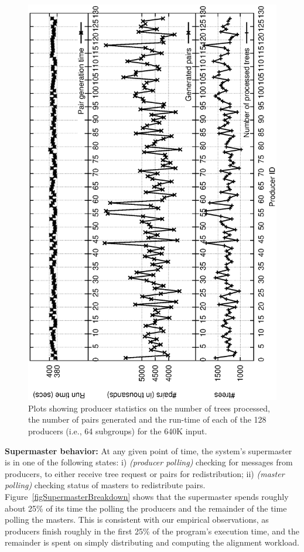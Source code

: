 \documentclass[10pt,journal,letterpaper,compsoc]{IEEEtran}
\begin{document}
\begin{figure}[tb]
\centerline{
            \includegraphics[angle=-90, scale=0.35]{producer.eps}
}
\caption{
Plots showing producer statistics on the number of trees processed, the number of pairs generated and the run-time of each of the 128 producers (i.e., 64 subgroups) for the 640K input.
}
\label{figProducer}
\end{figure}

{\bf Supermaster behavior:} At any given point of time, the system's supermaster is in one of the following states: i) \emph{(producer polling)} checking for messages from producers, to either receive tree request or pairs for redistribution; ii) \emph{(master polling)} checking status of masters to redistribute pairs.  Figure~\ref{figSupermasterBreakdown} shows that the supermaster spends roughly about 25\% of its time the polling the producers and the remainder of the time polling the masters. This is consistent with our empirical observations, as producers finish roughly in the first 25\% of the program's execution time, and the remainder is spent on simply distributing and computing the alignment workload. 
\end{document}
